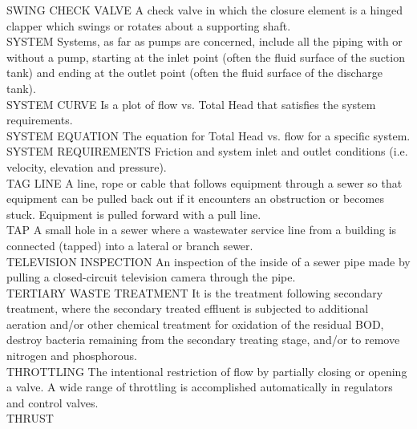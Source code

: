 \documentclass{article}
\begin{document}
SWING CHECK VALVE
A check valve in which the closure element is a hinged clapper which swings or rotates about a supporting shaft.
\vspace{0.3cm}\\
SYSTEM
Systems, as far as pumps are concerned, include all the piping with or without a pump, starting at the inlet point (often the fluid surface of the suction tank) and ending at the outlet point (often the fluid surface of the discharge tank).
\vspace{0.3cm}\\
SYSTEM CURVE
Is a plot of flow vs. Total Head that satisfies the system requirements.
\vspace{0.3cm}\\
SYSTEM EQUATION
The equation for Total Head vs. flow for a specific system.
\vspace{0.3cm}\\
SYSTEM REQUIREMENTS
Friction and system inlet and outlet conditions (i.e. velocity, elevation and pressure).
\vspace{0.3cm}\\
TAG LINE
A line, rope or cable that follows equipment through a sewer so that equipment can be pulled back out if it encounters an obstruction or becomes stuck. Equipment is pulled forward with a pull line. 
\vspace{0.3cm}\\
TAP
A small hole in a sewer where a wastewater service line from a building is connected (tapped) into a lateral or branch sewer. 
\vspace{0.3cm}\\
TELEVISION INSPECTION
An inspection of the inside of a sewer pipe made by pulling a closed-circuit television camera through the pipe. 
\vspace{0.3cm}\\
TERTIARY WASTE TREATMENT
It is the treatment following secondary treatment, where the secondary treated effluent is subjected to additional aeration and/or other chemical treatment for oxidation of the residual BOD, destroy bacteria remaining from the secondary treating stage, and/or to remove nitrogen and phosphorous. 
\vspace{0.3cm}\\
THROTTLING
The intentional restriction of flow by partially closing or opening a valve. A wide range of throttling is accomplished automatically in regulators and control valves.
\vspace{0.3cm}\\
THRUST
\end{document}
